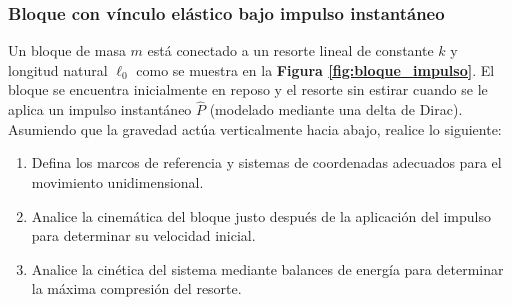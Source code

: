 \subsubsection{Bloque con vínculo elástico bajo impulso instantáneo}

Un bloque de masa $m$ está conectado a un resorte lineal de constante $k$ y longitud natural $\ell_0$ como se muestra en la \textbf{Figura \ref{fig:bloque_impulso}}. El bloque se encuentra inicialmente en reposo y el resorte sin estirar cuando se le aplica un impulso instantáneo $\hat{P}$ (modelado mediante una delta de Dirac). Asumiendo que la gravedad actúa verticalmente hacia abajo, realice lo siguiente:

\begin{enumerate}
    \item Defina los marcos de referencia y sistemas de coordenadas adecuados para el movimiento unidimensional.
    \item Analice la cinemática del bloque justo después de la aplicación del impulso para determinar su velocidad inicial.
    \item Analice la cinética del sistema mediante balances de energía para determinar la máxima compresión del resorte.
\end{enumerate}

